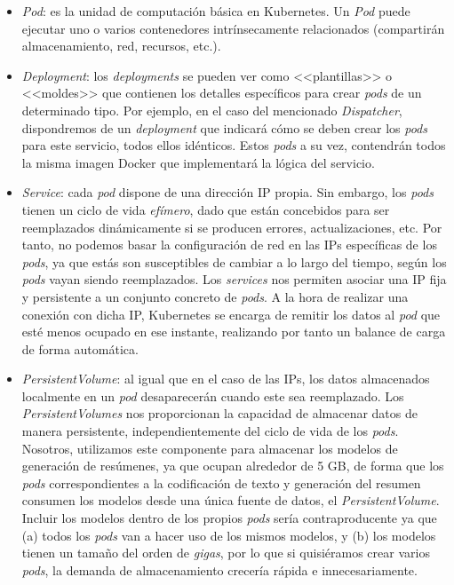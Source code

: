 \vspace{-0.5cm}
\begin{itemize}
	\item [\textbullet] \emph{Pod}: es la unidad de computación básica en Kubernetes. Un \emph{Pod} puede ejecutar uno o varios contenedores intrínsecamente relacionados (compartirán almacenamiento, red, recursos, etc.). 
	\item [\textbullet] \emph{Deployment}: los \emph{deployments} se pueden ver como <<plantillas>> o <<moldes>> que contienen los detalles específicos para crear \emph{pods} de un determinado tipo. Por ejemplo, en el caso del mencionado \emph{Dispatcher}, dispondremos de un \emph{deployment} que indicará cómo se deben crear los \emph{pods} para este servicio, todos ellos idénticos. Estos \emph{pods} a su vez, contendrán todos la misma imagen Docker que implementará la lógica del servicio.
	\item [\textbullet] \emph{Service}: cada \emph{pod} dispone de una dirección IP propia. Sin embargo, los \emph{pods} tienen un ciclo de vida \emph{efímero}, dado que están concebidos para ser reemplazados dinámicamente si se producen errores, actualizaciones, etc. Por tanto, no podemos basar la configuración de red en las IPs específicas de los \emph{pods}, ya que estás son susceptibles de cambiar a lo largo del tiempo, según los \emph{pods} vayan siendo reemplazados. Los \emph{services} nos permiten asociar una IP fija y persistente a un conjunto concreto de \emph{pods}. A la hora de realizar una conexión con dicha IP, Kubernetes se encarga de remitir los datos al \emph{pod} que esté menos ocupado en ese instante, realizando por tanto un balance de carga de forma automática.
	
	\item [\textbullet] \emph{PersistentVolume}: al igual que en el caso de las IPs, los datos almacenados localmente en un \emph{pod} desaparecerán cuando este sea reemplazado. Los \emph{PersistentVolumes} nos proporcionan la capacidad de almacenar datos de manera persistente, independientemente del ciclo de vida de los \emph{pods}. Nosotros, utilizamos este componente para almacenar los modelos de generación de resúmenes, ya que ocupan alrededor de 5 GB, de forma que los \emph{pods} correspondientes a la codificación de texto y generación del resumen consumen los modelos desde una única fuente de datos, el \emph{PersistentVolume}. Incluir los modelos dentro de los propios \emph{pods} sería contraproducente ya que (a) todos los \emph{pods} van a hacer uso de los mismos modelos, y (b) los modelos tienen un tamaño del orden de \emph{gigas}, por lo que si quisiéramos crear varios \emph{pods}, la demanda de almacenamiento crecería rápida e innecesariamente.
\end{itemize}

